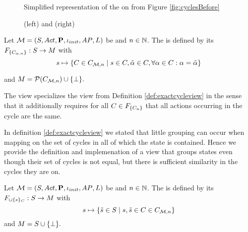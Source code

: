 \documentclass[preview]{standalone}
\begin{document}
\begin{figure}[h]
	\centering
	
	\caption{Simplified representation of the \viewN \viewhascycle on \mdp from Figure \ref{fig:cyclesBefore}}
	\label{fig:cycleAfterHas}  
\end{figure}

\begin{figure}[h]
	\begin{minipage}{.5\textwidth}
		
	\end{minipage}%
	\begin{minipage}{.5\textwidth}
		
	\end{minipage}
	\caption{\viewNC \viewexactactcycle[0] (left) and \viewN \viewexactactcycle[5] (right)}
	\label{fig:cycleAfterExtact0}  
\end{figure}



\begin{definition}
	Let ${{{\mathcal{M}}}} = {{({S}, {Act}, {\textbf{P}}, {\iota_{init}}, {AP}, {L})}}$ be \achgphN and $n \in {\mathbb{N}}$. The \viewN \viewexactactcycle is defined by its \grpfctN ${{F_{{\{{C}_{{\alpha},{{n}}}\}}}}} : {S} \to {\ensuremath{{M}}}$ with
	\[
	\state \mapsto \{\cycle \in \cycleset \mid \state \in \cycle, \tilde{\action} \in \cycle, \forall \action \in \cycle : \action = \tilde{\action} \}
	\]
	
	and ${{M}} = {\mathcal{P}({{C}_{{{\mathcal{M}}}, n}})} \cup {\{\bot\}}.$
\end{definition}

The view specializes the view from Definition \ref{def:exactcycleview} in the sense that it additionally requires for all ${C} \in {\ensuremath{{F_{{\{{C}_{{n}}\}}}}}}$ that all actions occurring in the cycle are the same. 


In definition \ref{def:exactcycleview} we stated that little grouping can occur when mapping on the set of cycles in all of which the state is contained. Hence we provide the definition and implemenation of a view that groups states even though their set of cycles is not equal, but there is sufficient similarity in the cycles they are on.

\begin{definition}
	Let ${{{\mathcal{M}}}} = {{({S}, {Act}, {\textbf{P}}, {\iota_{init}}, {AP}, {L})}}$ be \achgphN and $n \in {\mathbb{N}}$. The \viewN \viewcycleset is defined by its \grpfctN $\gfctcycleset : \states \to \imggrp$ with
	\[
	\state \mapsto \{\smstate \in \states \mid \state, \smstate \in \cycle \in \cycleset\}
	\]
	and ${{M}} = {S} \cup {\{\bot\}}.$
\end{definition}
\end{document}

